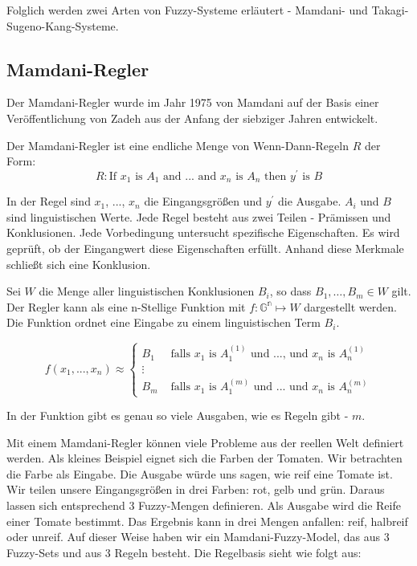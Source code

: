 Folglich werden zwei Arten von Fuzzy-Systeme erläutert - Mamdani- und Takagi-Sugeno-Kang-Systeme.

\subsection{Mamdani-Regler}

Der Mamdani-Regler wurde im Jahr 1975 von Mamdani auf der Basis einer Veröffentlichung von Zadeh aus der Anfang der siebziger Jahren entwickelt. 

Der Mamdani-Regler ist eine endliche Menge von Wenn-Dann-Regeln $R$ der Form:
\begin{equation}
R: \text{If } x_1 \text{ is } A_1 \text{ and ... and } x_n \text{ is } A_n
\text{ then } y^\prime \text{ is } B
\end{equation}

In der Regel sind $x_1$, ..., $x_n$ die Eingangsgrößen und $y^\prime$ die Ausgabe. $A_i$ und $B$ sind  linguistischen Werte. Jede Regel besteht aus zwei Teilen - Prämissen und Konklusionen. Jede Vorbedingung untersucht spezifische Eigenschaften. Es wird geprüft, ob der Eingangwert diese Eigenschaften erfüllt. Anhand diese Merkmale schließt sich eine Konklusion. 

Sei $W$ die Menge aller linguistischen Konklusionen $B_i$, so dass $B_1, \dots, B_m \in W$ gilt. Der Regler kann als eine n-Stellige Funktion mit $f: \mathbb{G^n} \mapsto W$ dargestellt werden. Die Funktion ordnet eine Eingabe zu einem linguistischen Term $B_i$.

\begin{equation}
f(x_1, ..., x_n) \approx 
\left\{
\begin{array}{ll}
B_1 & \mbox{ falls } x_1 \mbox{ is } A_1^{(1)} \mbox{ und ..., und } x_{n} \mbox{ is } A_n^{(1)}\\
\vdots \\
B_{m} & \mbox{ falls } x_1 \mbox{ is } A_1^{(m)} \mbox{ und ... und } x_{n} \mbox{ is } A_n^{(m)}
\end{array}
\right.
\end{equation}

In der Funktion gibt es genau so viele Ausgaben, wie es Regeln gibt - $m$.

Mit einem Mamdani-Regler können viele Probleme aus der reellen Welt definiert werden. Als kleines Beispiel eignet sich die Farben der Tomaten. Wir betrachten die Farbe als Eingabe. Die Ausgabe würde uns sagen, wie reif eine Tomate ist. Wir teilen unsere Eingangsgrößen in drei Farben: rot, gelb und grün. Daraus lassen sich entsprechend 3 Fuzzy-Mengen definieren. Als Ausgabe wird die Reife einer Tomate bestimmt. Das Ergebnis kann in drei Mengen anfallen: reif, halbreif oder unreif. Auf dieser Weise haben wir ein Mamdani-Fuzzy-Model, das aus 3 Fuzzy-Sets und aus 3 Regeln besteht. Die Regelbasis sieht wie folgt aus:

